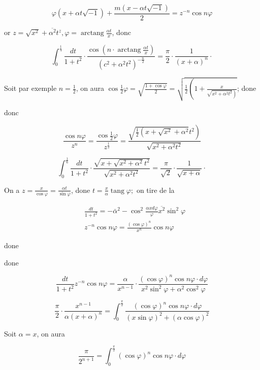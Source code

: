 \documentclass{article}
\begin{document}
\[
\varphi(x+\alpha t \sqrt{-1})+\frac{m(x-\alpha t \sqrt{-1})}{2}=z^{-n} \cos n \varphi
\]

or \(z=\sqrt{x^{2}}+\overline{\alpha^{2}} t^{z}, \varphi=\operatorname{arctang} \frac{\alpha t}{x}\), donc

\[
\int_{0}^{\frac{1}{4}} \frac{d t}{1+t^{2}} \cdot \frac{\cos \left(n \cdot \operatorname{arctang} \frac{\alpha t}{x}\right)}{\left(c^{2}+\alpha^{2} t^{2}\right)^{-\frac{n}{2}}}=\frac{\pi}{2} \cdot \frac{1}{(x+\alpha)^{n}} \cdot
\]

Soit par exemple \(n=\frac{1}{2}\), on aura \(\cos \frac{1}{2} \varphi=\sqrt{\frac{1+\cos \varphi}{2}}=\sqrt{\frac{1}{2}\left(1+\frac{x}{\left.\sqrt{x^{2}+\alpha^{2} t^{2}}\right)}\right.}\); done

donc

\[
\frac{\cos n \varphi}{z^{n}}=\frac{\cos \frac{1}{2} \varphi}{z^{\frac{1}{2}}}=\frac{\left.\sqrt{\frac{1}{2}\left(x+\sqrt{x^{2}}+\alpha^{2}\right.} t^{2}\right)}{\sqrt{x^{2}+\alpha^{2} t^{2}}}
\]

\[
\int_{0}^{\frac{1}{6}} \frac{d t}{1+t^{2}} \cdot \frac{\sqrt{x+\sqrt{x^{2}+\alpha^{2}} t^{2}}}{\sqrt{x^{2}+\alpha^{2} t^{2}}}=\frac{\pi}{\sqrt{2}} \cdot \frac{1}{\sqrt{x+\alpha}} \cdot
\]

On a \(z=\frac{x}{\cos \varphi}=\frac{\alpha t}{\sin \varphi}\), done \(t=\frac{x}{\alpha} \operatorname{tang} \varphi ;\) on tire de la

\[
\begin{aligned}
& \frac{d t}{1+t^{2}}=-\bar{\alpha}^{2}-\cos ^{2} \frac{\alpha x d \varphi}{\varphi} \overline{x^{2}} \sin ^{2} \varphi \\
& z^{-n} \cos n \varphi=\frac{(\cos \varphi)^{n}}{x^{n}} \cos n \varphi
\end{aligned}
\]

done

done

\[
\frac{d t}{1+t^{2}} z^{-n} \cos n \varphi=\frac{\alpha}{x^{n-1}} \cdot \frac{(\cos \varphi)^{n} \cos n \varphi \cdot d \varphi}{x^{2} \sin ^{2} \varphi+\alpha^{2} \cos ^{2} \varphi}
\]

\[
\frac{\pi}{2} \cdot \frac{x^{n-1}}{\alpha(x+\alpha)^{n}}=\int_{0}^{\frac{\pi}{2}} \frac{(\cos \varphi)^{n} \cos n \varphi \cdot d \varphi}{(x \sin \varphi)^{2}+(\alpha \cos \varphi)^{2}}
\]

Soit \(\alpha=x\), on aura

\[
\frac{\pi}{2^{n+1}}=\int_{0}^{\frac{\pi}{2}}(\cos \varphi)^{n} \cos n \varphi \cdot d \varphi
\]
\end{document}
